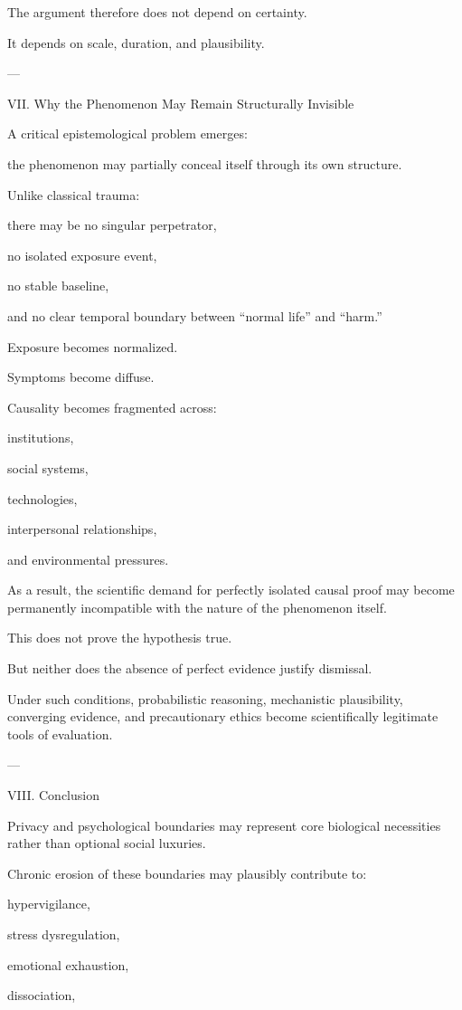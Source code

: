 The argument therefore does not depend on certainty.

It depends on scale, duration, and plausibility.


---

VII. Why the Phenomenon May Remain Structurally Invisible

A critical epistemological problem emerges:

the phenomenon may partially conceal itself through its own structure.

Unlike classical trauma:

there may be no singular perpetrator,

no isolated exposure event,

no stable baseline,

and no clear temporal boundary between “normal life” and “harm.”


Exposure becomes normalized.

Symptoms become diffuse.

Causality becomes fragmented across:

institutions,

social systems,

technologies,

interpersonal relationships,

and environmental pressures.


As a result, the scientific demand for perfectly isolated causal proof may become permanently incompatible with the nature of the phenomenon itself.

This does not prove the hypothesis true.

But neither does the absence of perfect evidence justify dismissal.

Under such conditions, probabilistic reasoning, mechanistic plausibility, converging evidence, and precautionary ethics become scientifically legitimate tools of evaluation.


---

VIII. Conclusion

Privacy and psychological boundaries may represent core biological necessities rather than optional social luxuries.

Chronic erosion of these boundaries may plausibly contribute to:

hypervigilance,

stress dysregulation,

emotional exhaustion,

dissociation,

